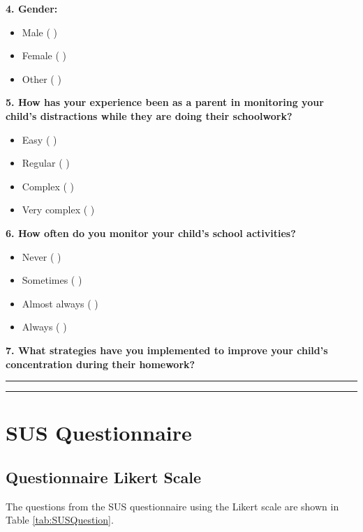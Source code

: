 \documentclass[a4paper,fleqn]{cas-sc}
\begin{document}
	\noindent
	\textbf{4. Gender:}
	
	\begin{itemize}
		\item Male ( )
		\item Female ( )
		\item Other ( )
	\end{itemize}
	
	\noindent
	\textbf{5. How has your experience been as a parent in monitoring your child's distractions while they are doing their schoolwork?}
	
	\begin{itemize}
		\item Easy ( )
		\item Regular ( )
		\item Complex ( )
		\item Very complex ( )
	\end{itemize}
	
	\noindent
	\textbf{6. How often do you monitor your child's school activities?}
	
	\begin{itemize}
		\item Never ( )
		\item Sometimes ( )
		\item Almost always ( )
		\item Always ( )
	\end{itemize}
	
	\noindent
	\textbf{7. What strategies have you implemented to improve your child's concentration during their homework?}
	
	\vspace{12pt}
	\noindent
	\rule{\textwidth}{1pt}
	
	\vspace{12pt}
	\noindent
	\rule{\textwidth}{1pt}
	
	\clearpage
	\section[\appendixname~\thesection]{SUS Questionnaire}
	\label{Appendix:SUSQuestionarie}
	
	
	\subsection[\appendixname~\thesection]{Questionnaire Likert Scale}
	\label{Appendix:LikertScale}
	The questions from the SUS questionnaire using the Likert scale are shown in Table \ref{tab:SUSQuestion}.
	
\end{document}
